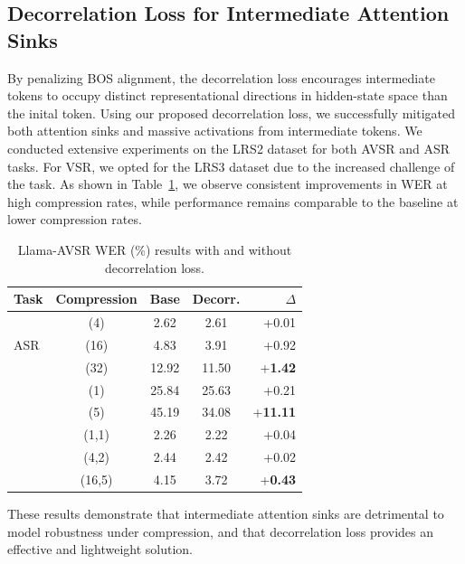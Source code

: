 \documentclass{article}
\begin{document}
\subsection{Decorrelation Loss for Intermediate Attention Sinks}
By penalizing BOS alignment, the decorrelation loss encourages intermediate tokens to occupy distinct representational directions in hidden-state space than the inital token. Using our proposed decorrelation loss, we successfully mitigated both attention sinks and massive activations from intermediate tokens. We conducted extensive experiments on the LRS2 dataset for both AVSR and ASR tasks. For VSR, we opted for the LRS3 dataset due to the increased challenge of the task. As shown in Table~\ref{tab:decor}, we observe consistent improvements in WER at high compression rates, while performance remains comparable to the baseline at lower compression rates.
\begin{table}[t]
    \centering
    \caption{Llama-AVSR WER (\%) results with and without decorrelation loss.}
    \begin{tabular}{lcccr}
        \toprule
        \textbf{Task} & \textbf{Compression} & \textbf{Base} & \textbf{Decorr.} & $\Delta$ \\
        \midrule
        \multirow{3}{*}{ASR} 
            & (4)     & 2.62 & 2.61 & +0.01 \\
            & (16)    & 4.83 & 3.91 & +0.92 \\
            & (32)    & 12.92 & 11.50 & +\textbf{1.42} \\
        \hdashline
        \multirow{2}{*}{VSR} 
            & (1)     & 25.84 & 25.63 & +0.21 \\
            & (5)     & 45.19 & 34.08 & +\textbf{11.11} \\
        \hdashline
        \multirow{4}{*}{AVSR} 
            & (1,1)   & 2.26 & 2.22 & +0.04 \\
            & (4,2)   & 2.44 & 2.42 & +0.02 \\
            & (16,5)  & 4.15 & 3.72 & +\textbf{0.43} \\
\bottomrule
    \end{tabular}
    \label{tab:decor}
    \vspace{-0.2cm}
\end{table}
These results demonstrate that intermediate attention sinks are detrimental to model robustness under compression, and that decorrelation loss provides an effective and lightweight solution.
\end{document}
